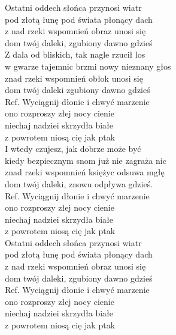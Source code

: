 
\begin{flushleft}
Ostatni oddech słońca przynosi wiatr  \\
pod złotą łunę pod świata płonący dach  \\
z nad rzeki wspomnień obraz unosi się  \\
dom twój daleki, zgubiony dawno gdzieś  \\
\vskip 3mm
Z dala od bliskich, tak nagle rzucił los  \\
w gwarze tajemnic brzmi nowy nieznany głos  \\
znad rzeki wspomnień obłok unosi się  \\
dom twój daleki zgubiony dawno gdzieś  \\
\vskip 3mm
Ref. Wyciągnij dłonie i chwyć marzenie  \\
\hspace{0.9cm}ono rozproszy złej nocy cienie  \\
\hspace{0.9cm}niechaj nadziei skrzydła białe  \\
\hspace{0.9cm}z powrotem niosą cię jak ptak  \\
\vskip 3mm
I wtedy czujesz, jak dobrze może być  \\
kiedy bezpiecznym snom już nie zagraża nic  \\
znad rzeki wspomnień księżyc odsuwa mgłę  \\
dom twój daleki, znowu odpływa gdzieś. \\
\vskip 3mm
Ref. Wyciągnij dłonie i chwyć marzenie  \\
\hspace{0.9cm}ono rozproszy złej nocy cienie  \\
\hspace{0.9cm}niechaj nadziei skrzydła białe  \\
\hspace{0.9cm}z powrotem niosą cię jak ptak \\
\vskip 3mm
Ostatni oddech słońca przynosi wiatr  \\
pod złotą łunę pod świata płonący dach  \\
z nad rzeki wspomnień obraz unosi się  \\
dom twój daleki, zgubiony dawno gdzieś  \\
\vskip 3mm
Ref. Wyciągnij dłonie i chwyć marzenie  \\
\hspace{0.9cm}ono rozproszy złej nocy cienie  \\
\hspace{0.9cm}niechaj nadziei skrzydła białe  \\
\hspace{0.9cm}z powrotem niosą cię jak ptak \\
\end{flushleft}
\clearpage
